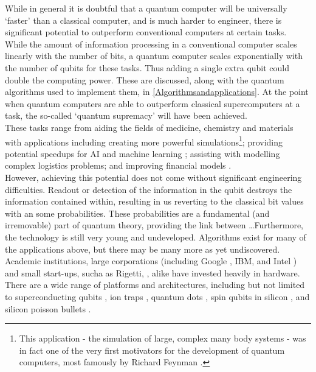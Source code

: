 While in general it is doubtful that a quantum computer will be universally  `faster' than a classical computer, and is much harder to engineer, there is significant potential to outperform conventional computers at certain tasks. While the amount of information processing in a conventional computer scales linearly with the number of bits, a quantum computer scales exponentially with the number of qubits for these tasks. Thus adding a single extra qubit could double the computing power. These are discussed, along with the quantum algorithms used to implement them, in \autoref{Algorithmsandapplications}. At the point when quantum computers are able to outperform classical supercomputers at a task, the so-called `quantum supremacy' \cite{Preskill2012} will have been achieved. \\



These tasks range from aiding the fields of medicine, chemistry and materials with applications including creating more powerful simulations\footnote{This application - the simulation of large, complex many body systems - was in fact one of the very first motivators for the development of quantum computers, most famously by Richard Feynman \cite{Feynman1982simulating}.}\cite{Georgescu2014Sim}; providing potential speedups for AI and machine learning \cite{Biamonte2017QML}; assisting with modelling complex logistics problems; and improving financial models \cite{Schaden2002quantumfinance}.\\

However, achieving this potential does not come without significant engineering difficulties. Readout or detection of the information in the qubit destroys the information contained within, resulting in us reverting to the classical bit values with an some probabilities. These probabilities  are a fundamental (and irremovable) part of quantum theory, providing the link between \ldots Furthermore, the technology is still very young and undeveloped. Algorithms exist for many of the applications above, but there may be many more as yet undiscovered. Academic institutions, large corporations (including Google \cite{googleqai, bristlecone}, IBM, \cite{ibmqweb} and Intel \cite{intelqcomp}) and small start-ups, sucha as Rigetti, \cite{rigettihome}, alike have invested heavily in hardware. There are a wide range of platforms and architectures, including but not limited to superconducting qubits \cite{bristlecone}, ion traps \cite{steane1997ionTrap}, quantum dots \cite{loss1998quantumdots}, spin qubits in silicon \cite{intelSCspinqubits}, and silicon poisson bullets \cite{RudolphSiliconPhotonicsQC}. \\

